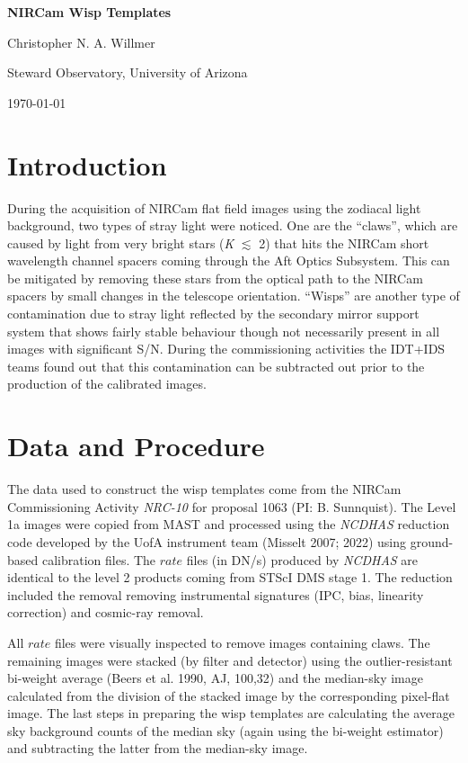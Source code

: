 \documentclass[12pt]{article}
\begin{document}
\Large
{\centerline{\bf{NIRCam Wisp Templates}}}
\large
{\centerline{Christopher N. A. Willmer}}
{\centerline{Steward Observatory, University of Arizona}}
{\centerline{\today}}

\section{Introduction}
During the acquisition of NIRCam flat field images using the zodiacal light
background, two types of stray light were noticed.
One are the ``claws'', which are caused by light from very
bright stars (\textsl{K} $\lesssim$ 2) that hits the NIRCam short
wavelength channel spacers coming through the Aft Optics Subsystem. This can
be mitigated by removing these stars from the optical path to the
NIRCam spacers by small changes in the telescope orientation.
``Wisps'' are another type of contamination due to stray light reflected by 
the secondary mirror support system that  shows fairly stable behaviour though
not necessarily present in all images with significant S/N. During the
commissioning activities the IDT+IDS teams found out that this
contamination can be subtracted out prior to the production of the
calibrated images. 

\section{Data and Procedure}
The data used to construct the wisp templates come from
the NIRCam Commissioning Activity \textsl{NRC-10} for proposal 1063
(PI: B. Sunnquist). The Level 1a 
images were copied from MAST and processed using the \textsl{NCDHAS}
reduction code developed by the UofA instrument team (Misselt 2007;
2022) using ground-based calibration files. The $rate$ files (in DN/s)
produced by \textsl{NCDHAS} are identical to the level 2 products coming
from STScI DMS stage 1. The reduction included the removal
removing instrumental signatures (IPC, bias, linearity correction) and
cosmic-ray removal.

All $rate$ files were visually inspected to remove images containing
claws. The remaining images were stacked (by filter
and detector) using the outlier-resistant bi-weight average (Beers et
al. 1990, AJ, 100,32) and  the median-sky image calculated from the division
of the stacked image by the corresponding pixel-flat image.
The last steps in preparing the wisp templates are calculating the
average sky background counts of the median sky (again using the
bi-weight estimator) and subtracting the latter from the median-sky image.
\end{document}
